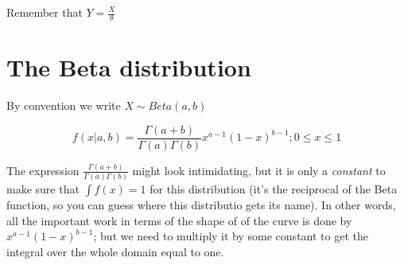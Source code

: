\documentclass[12pt]{extbook}
\begin{document}





Remember that $Y = \frac{X}{\theta}$












\section{The Beta distribution}

{\color{green} By convention we write $X \sim Beta(a,b)$}

\begin{displaymath}
f(x|a,b) = \frac{\Gamma(a + b)}{\Gamma(a)\Gamma(b)} x^{a-1}(1-x)^{b-1};0 \leq x \leq 1
\end{displaymath}

The expression $\frac{\Gamma(a + b)}{\Gamma(a)\Gamma(b)}$ might look intimidating, but it is only a \emph{constant} to make sure that $\int f(x)=1$ for this distribution (it's the reciprocal of the Beta function, so you can guess where this distributio gets its name).   In other words, all the important work in terms of the shape of of the curve is done by $ x^{a-1}(1-x)^{b-1}$; but we need to multiply it by some constant to get the integral over the whole domain equal to one.
\end{document}
